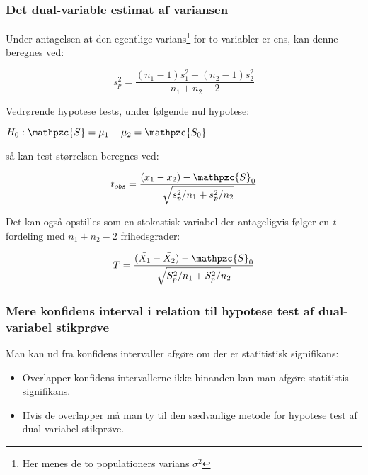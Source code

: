 \documentclass{article}
\newcommand{\mellemrum}{\vspace{2 ex}}
\newcommand{\cent}[1]{ \mellemrum \begin{center} #1\end{center} \mellemrum }
\newcommand{\script}[1]{\mathpzc{#1}}
\begin{document}
	\subsubsection{Det dual-variable estimat af variansen}
	
	Under antagelsen at den egentlige varians\footnote{Her menes de to populationers varians $\sigma^2$} for to variabler er ens, kan denne beregnes ved:
	
	\cent{$$ s_p^2 =  \frac{(n_1 -1)s_1^2 + (n_2 -1)s_2^2}{n_1 +n_2 -2} $$}
	
	Vedrørende hypotese tests, under følgende nul hypotese:
	
	\cent{$ H_0 :  \script{S} = \mu_1 - \mu_2 = \script{S_0} $}
		
	så kan test størrelsen beregnes ved:
	
	\cent{$$ t_{obs} = \frac{(\bar{x_1} - \bar{x_2}) - \script{S}_0}{\sqrt{s_p^2/n_1 + s_p^2/n_2}} $$}
	
	Det kan også opstilles som en stokastisk variabel der antageligvis følger en \textit{t}-fordeling med $n_1 + n_2 -2$ frihedsgrader:
	
	\cent{$$ T = \frac{(\bar{X_1} - \bar{X_2}) - \script{S}_0}{\sqrt{S_p^2/n_1 + S_p^2/n_2}} $$}
	
	\subsubsection{Mere konfidens interval i relation til hypotese test af dual-variabel stikprøve}
	
	Man kan ud fra konfidens intervaller afgøre om der er statitistisk signifikans:
	
	\begin{itemize}
		\item Overlapper konfidens intervallerne ikke hinanden kan man afgøre statitistis signifikans.
		\item Hvis de overlapper må man ty til den sædvanlige metode for hypotese test af dual-variabel stikprøve.
	\end{itemize}
	
	
	
\end{document}
